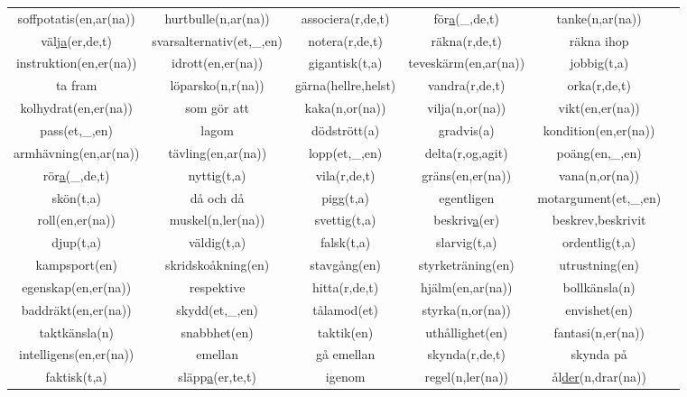 \begin{center}
    \begin{adjustwidth}{-2.2cm}{}
        \begin{tabular}{|c c c c c c|}
            \hline
            soffpotatis(en,ar(na)) & hurtbulle(n,ar(na)) & associera(r,de,t) & för\underline{a}(\_,de,t) & tanke(n,ar(na)) & \\
            välj\underline{a}(er,de,t) & svarsalternativ(et,\_,en) & notera(r,de,t) & räkna(r,de,t) & räkna ihop & \\
            instruktion(en,er(na)) & idrott(en,er(na)) & gigantisk(t,a) & teveskärm(en,ar(na)) & jobbig(t,a) & \\
            ta fram & löparsko(n,r(na)) & gärna(hellre,helst) & vandra(r,de,t) & orka(r,de,t) & \\
            kolhydrat(en,er(na)) & som gör att & kaka(n,or(na)) & vilja(n,or(na)) & vikt(en,er(na)) & \\
            pass(et,\_,en) & lagom & dödstrött(a) & gradvis(a) & kondition(en,er(na)) & \\
            armhävning(en,ar(na)) & tävling(en,ar(na)) & lopp(et,\_,en) & delta(r,og,agit) & poäng(en,\_,en) & \\
            rör\underline{a}(\_,de,t) & nyttig(t,a) & vila(r,de,t) & gräns(en,er(na)) & vana(n,or(na)) & \\
            skön(t,a) & då och då & pigg(t,a) & egentligen & motargument(et,\_,en) & \\
            roll(en,er(na)) & muskel(n,ler(na)) & svettig(t,a) & beskriv\underline{a}(er) & beskrev,beskrivit & \\
            djup(t,a) & väldig(t,a) & falsk(t,a) & slarvig(t,a) & ordentlig(t,a) & \\
            kampsport(en) & skridskoåkning(en) & stavgång(en) & styrketräning(en) & utrustning(en) & \\
            egenskap(en,er(na)) & respektive & hitta(r,de,t) & hjälm(en,ar(na)) & bollkänsla(n) & \\
            baddräkt(en,er(na)) & skydd(et,\_,en) & tålamod(et) & styrka(n,or(na)) & envishet(en) & \\
            taktkänsla(n) & snabbhet(en) & taktik(en) & uthållighet(en) & fantasi(n,er(na)) & \\
            intelligens(en,er(na)) & emellan & gå emellan & skynda(r,de,t) & skynda på & \\
            faktisk(t,a) & släpp\underline{a}(er,te,t) & igenom & regel(n,ler(na)) & ål\underline{der}(n,drar(na)) & \\

\end{tabular}
\end{adjustwidth}
\end{center}

